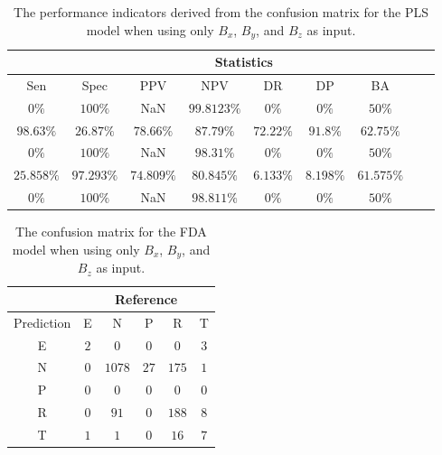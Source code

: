 \begin{table}[!ht]
	\centering
	\begin{tabular}{|c|c|c|c|c|c|c|c|c|}
		\hline
		 & \multicolumn{7}{c|}{Statistics} \\ \hline
		Sen & Spec & PPV & NPV & DR & DP & BA \\ \hline
		$0\%$ & $100\%$ & NaN & $99.8123\%$ & $0\%$ & $0\%$ & $50\%$ \\ \hline
		$98.63\%$ & $26.87\%$ & $78.66\%$ & $87.79\%$ & $72.22\%$ & $91.8\%$ & $62.75\%$ \\ \hline
		$0\%$ & $100\%$ & NaN & $98.31\%$ & $0\%$ & $0\%$ & $50\%$ \\ \hline
		$25.858\%$ & $97.293\%$ & $74.809\%$ & $80.845\%$ & $6.133\%$ & $8.198\%$ & $61.575\%$ \\ \hline
		$0\%$ & $100\%$ & NaN & $98.811\%$ & $0\%$ & $0\%$ & $50\%$ \\ \hline
	\end{tabular}
	\caption{The performance indicators derived from the confusion matrix for the PLS model when using only $B_{x}$, $B_{y}$, and $B_{z}$ as input.}
	\label{tab:cs:coord:pls}
\end{table}

\begin{table}[!ht]
	\centering
	\begin{tabular}{|c|c|c|c|c|c|}
		\hline
		 & \multicolumn{5}{|c|}{Reference} \\ \hline
		 Prediction & E & N & P & R & T \\ \hline
		 E & $2$ & $0$ & $0$ & $0$ & $3$ \\ \hline
		 N & $0$ & $1078$ & $27$ & $175$ & $1$ \\ \hline
		 P & $0$ & $0$ & $0$ & $0$ & $0$ \\ \hline
		 R & $0$ & $91$ & $0$ & $188$ & $8$ \\ \hline
		 T & $1$ & $1$ & $0$ & $16$ & $7$ \\ \hline
	\end{tabular}
	\caption{The confusion matrix for the FDA model when using only $B_{x}$, $B_{y}$, and $B_{z}$ as input.}
	\label{tab:cm:coord:fda}
\end{table}

